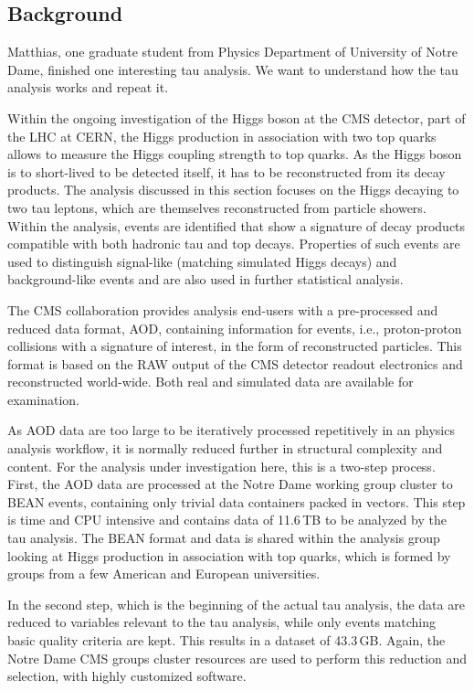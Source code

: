 \documentclass{acm_proc_article-sp}
\begin{document}
\subsection{Background}
Matthias, one graduate student from Physics Department of University of Notre Dame, finished one interesting tau analysis. We want to understand how the tau analysis works and repeat it. 

Within the ongoing investigation of the Higgs boson at the CMS
detector, part of the LHC at CERN, the Higgs production in association
with two top quarks allows to measure the Higgs coupling strength to
top quarks.  As the Higgs boson is to short-lived to be detected
itself, it has to be reconstructed from its decay products.  The
analysis discussed in this section focuses on the Higgs decaying to
two tau leptons, which are themselves reconstructed from particle
showers.  Within the analysis, events are identified that show a
signature of decay products compatible with both hadronic tau and top
decays.  Properties of such events are used to distinguish signal-like
(matching simulated Higgs decays) and background-like events and are
also used in further statistical analysis.

The CMS collaboration provides analysis end-users with a pre-processed
and reduced data format, AOD, containing information for events, i.e.,
proton-proton collisions with a signature of interest, in the form of
reconstructed particles.  This format is based on the RAW output of
the CMS detector readout electronics and reconstructed world-wide.
Both real and simulated data are available for examination.

As AOD data are too large to be iteratively processed repetitively in
an physics analysis workflow, it is normally reduced further in
structural complexity and content.  For the analysis under
investigation here, this is a two-step process.  First, the AOD data
are processed at the Notre Dame working group cluster to BEAN events,
containing only trivial data containers packed in vectors.  This step
is time and CPU intensive and contains data of 11.6$\,$TB to be
analyzed by the tau analysis.  The BEAN format and data is shared
within the analysis group looking at Higgs production in association
with top quarks, which is formed by groups from a few American and
European universities.

In the second step, which is the beginning of the actual tau analysis,
the data are reduced to variables relevant to the tau analysis, while
only events matching basic quality criteria are kept.  This results in
a dataset of 43.3$\,$GB.  Again, the Notre Dame CMS groups cluster
resources are used to perform this reduction and selection, with
highly customized software.
\end{document}
